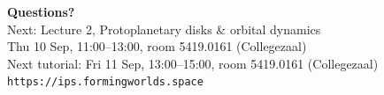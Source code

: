 \documentclass[aspectratio=169, 11pt]{beamer}
\begin{document}
\begin{frame}
  \vfill
  \begin{center}
    {\color{white}\LARGE\bfseries Questions?}\\[14pt]
    {\color{white!85}\large Next: Lecture 2, Protoplanetary disks \& orbital dynamics}\\[4pt]
    {\color{white!85}\small Thu 10 Sep, 11:00--13:00, room 5419.0161 (Collegezaal)}\\[12pt]
    {\color{white!85}\small Next tutorial: Fri 11 Sep, 13:00--15:00, room 5419.0161 (Collegezaal)}\\[20pt]
    {\color{white!70}\small \texttt{https://ips.formingworlds.space}}
  \end{center}
  \vfill
\end{frame}
\end{document}
